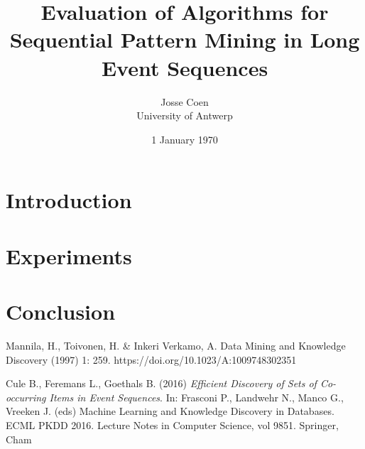 \documentclass{scrartcl}
\theoremstyle{definition}
\begin{document}
\frenchspacing

\title{Evaluation of Algorithms for Sequential Pattern Mining in Long Event Sequences}
\subtitle{}

\author{Josse Coen
\vspace{.3cm}\\
%
University of Antwerp
%
}

\date{1 January 1970}

\maketitle

\section{Introduction}
\newpage


\newpage


\newpage




\section{Experiments}


\section{Conclusion}

\begin{thebibliography}{99}

 Mannila, H., Toivonen, H. \& Inkeri Verkamo, A. Data Mining and Knowledge Discovery (1997) 1: 259. https://doi.org/10.1023/A:1009748302351

 Cule B., Feremans L., Goethals B. (2016) \textit{Efficient Discovery of Sets of Co-occurring Items in Event Sequences}. In: Frasconi P., Landwehr N., Manco G., Vreeken J. (eds) Machine Learning and Knowledge Discovery in Databases. ECML PKDD 2016. Lecture Notes in Computer Science, vol 9851. Springer, Cham

\end{thebibliography}
\end{document}
